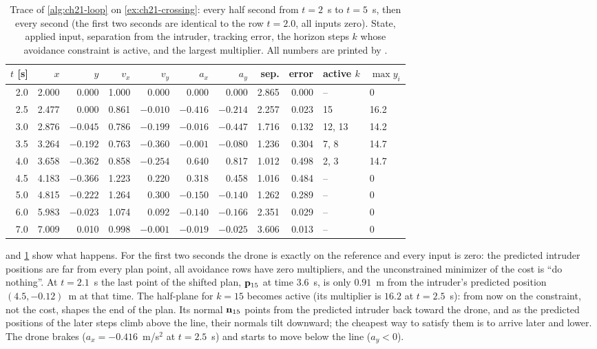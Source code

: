 \begin{table}[tb]
\centering\small
\caption{Trace of \cref{alg:ch21-loop} on \cref{ex:ch21-crossing}: every half
second from $t=2$~s to $t=5$~s, then every second (the first two seconds are
identical to the row $t=2.0$, all inputs zero). State, applied input,
separation from the intruder, tracking error, the horizon steps $k$ whose
avoidance constraint is active, and the largest multiplier. All numbers are
printed by .}
\label{tab:ch21-trace}
\begin{tabular}{@{}rrrrrrrrrll@{}}
\toprule
$t$ [s] & $x$ & $y$ & $v_x$ & $v_y$ & $a_x$ & $a_y$ & sep. & error & active $k$ & $\max y_i$\\
\midrule
2.0 & 2.000 & 0.000 & 1.000 & 0.000 & 0.000 & 0.000 & 2.865 & 0.000 & -- & 0\\
2.5 & 2.477 & 0.000 & 0.861 & $-0.010$ & $-0.416$ & $-0.214$ & 2.257 & 0.023 & 15 & 16.2\\
3.0 & 2.876 & $-0.045$ & 0.786 & $-0.199$ & $-0.016$ & $-0.447$ & 1.716 & 0.132 & 12, 13 & 14.2\\
3.5 & 3.264 & $-0.192$ & 0.763 & $-0.360$ & $-0.001$ & $-0.080$ & 1.236 & 0.304 & 7, 8 & 14.7\\
4.0 & 3.658 & $-0.362$ & 0.858 & $-0.254$ & 0.640 & 0.817 & 1.012 & 0.498 & 2, 3 & 14.7\\
4.5 & 4.183 & $-0.366$ & 1.223 & 0.220 & 0.318 & 0.458 & 1.016 & 0.484 & -- & 0\\
5.0 & 4.815 & $-0.222$ & 1.264 & 0.300 & $-0.150$ & $-0.140$ & 1.262 & 0.289 & -- & 0\\
6.0 & 5.983 & $-0.023$ & 1.074 & 0.092 & $-0.140$ & $-0.166$ & 2.351 & 0.029 & -- & 0\\
7.0 & 7.009 & 0.010 & 0.998 & $-0.001$ & $-0.019$ & $-0.025$ & 3.606 & 0.013 & -- & 0\\
\bottomrule
\end{tabular}
\end{table}

 and \cref{tab:ch21-trace} show what happens. For the
first two seconds the drone is exactly on the reference and every input is
zero: the predicted intruder positions are far from every plan point, all
avoidance rows have zero multipliers, and the unconstrained minimizer of the
cost is ``do nothing''. At $t=2.1$~s the last point of the shifted plan,
$\mathbf{p}_{15}$ at time $3.6$~s, is only $0.91$~m from the intruder's predicted
position $(4.5,-0.12)$~m at that time. The half-plane for $k=15$ becomes
active (its multiplier is $16.2$ at $t=2.5$~s): from now on the constraint,
not the cost, shapes the end of the plan. Its normal $\mathbf{n}_{15}$ points
from the predicted intruder back toward the drone, and as the predicted
positions of the later steps climb above the line, their normals tilt
downward; the cheapest way to satisfy them is to arrive later and lower. The
drone brakes ($a_x=-0.416$~m/s$^2$ at $t=2.5$~s) and starts to move below
the line ($a_y<0$).

